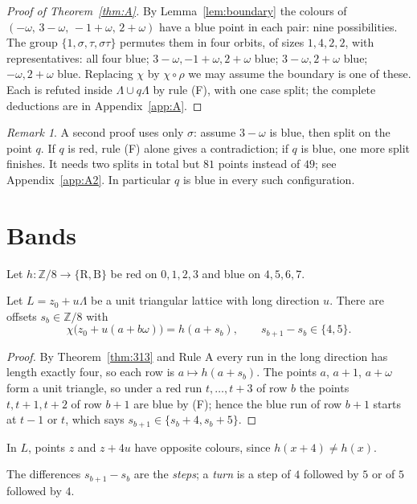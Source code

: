 \documentclass[11pt]{amsart}
\theoremstyle{definition}\newtheorem{definition}[theorem]{Definition}
\theoremstyle{remark}\newtheorem{remark}[theorem]{Remark}
\begin{document}
\begin{proof}[Proof of Theorem~\ref{thm:A}]
By Lemma~\ref{lem:boundary} the colours of $(-\omega,\,3-\omega,\,-1+\omega,\,2+\omega)$ have a blue point in each pair:
nine possibilities. The group $\{1,\sigma,\tau,\sigma\tau\}$ permutes them in four orbits, of sizes $1,4,2,2$, with
representatives: all four blue; $3-\omega,-1+\omega,2+\omega$ blue; $3-\omega,2+\omega$ blue; $-\omega,2+\omega$ blue.
Replacing $\chi$ by $\chi\circ\rho$ we may assume the boundary is one of these. Each is refuted inside
$\Lambda\cup q\Lambda$ by rule (F), with one case split; the complete deductions are in Appendix~\ref{app:A}.
\end{proof}

\begin{remark}
A second proof uses only $\sigma$: assume $3-\omega$ is blue, then split on the point $q$. If $q$ is red, rule (F)
alone gives a contradiction; if $q$ is blue, one more split finishes. It needs two splits in total but $81$ points
instead of $49$; see Appendix~\ref{app:A2}. In particular $q$ is blue in every such configuration.
\end{remark}

\section{Bands}\label{sec:bands}
Let $h:\mathbb Z/8\to\{\mathrm R,\mathrm B\}$ be red on $0,1,2,3$ and blue on $4,5,6,7$.
\begin{lemma}\label{lem:bands}
Let $L=z_0+u\Lambda$ be a unit triangular lattice with long direction $u$. There are offsets $s_b\in\mathbb Z/8$ with
\[
\chi\bigl(z_0+u(a+b\omega)\bigr)=h(a+s_b),\qquad s_{b+1}-s_b\in\{4,5\}.
\]
\end{lemma}
\begin{proof}
By Theorem~\ref{thm:313} and Rule A every run in the long direction has length exactly four, so each row is
$a\mapsto h(a+s_b)$. The points $a$, $a+1$, $a+\omega$ form a unit triangle, so under a red run $t,\dots,t+3$ of row $b$
the points $t,t+1,t+2$ of row $b+1$ are blue by (F); hence the blue run of row $b+1$ starts at $t-1$ or $t$, which
says $s_{b+1}\in\{s_b+4,s_b+5\}$.
\end{proof}
\begin{corollary}\label{cor:four}
In $L$, points $z$ and $z+4u$ have opposite colours, since $h(x+4)\ne h(x)$.
\end{corollary}
The differences $s_{b+1}-s_b$ are the \emph{steps}; a \emph{turn} is a step of $4$ followed by $5$ or of $5$ followed
by $4$.
\end{document}
